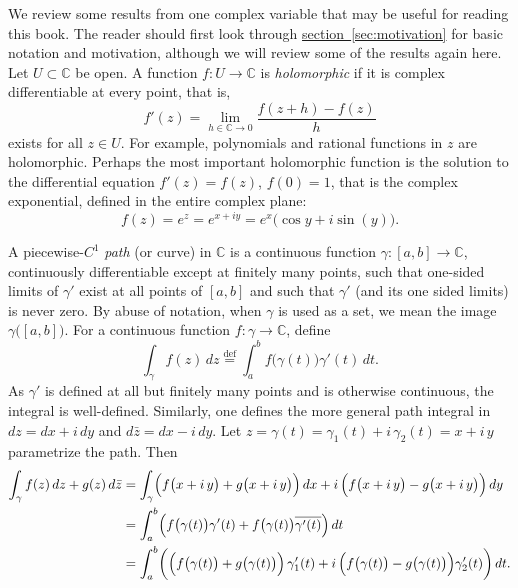 \documentclass[12pt,openany]{book}
\newcommand{\C}{{\mathbb{C}}}
\theoremstyle{plain}
\theoremstyle{remark}
\theoremstyle{definition}
\theoremstyle{exercise}
\theoremstyle{example}
\newcommand{\sectionref}[1]{\hyperref[#1]{section~\ref*{#1}}}
\begin{document}

We review some results from one complex variable that may be useful for
reading this book.
The reader should first look through \sectionref{sec:motivation}
for basic notation and motivation, although we will review some of the
results again here.
Let $U \subset \C$ be open.
A function
$f \colon U \to \C$ is \emph{holomorphic} if it is complex
differentiable at every point, that is,
\begin{equation*}
f'(z) = \lim_{h \in \C \to 0} \frac{f(z+h) - f(z)}{h}
\end{equation*}
exists for all $z \in U$.  For example, polynomials and rational
functions in $z$ are holomorphic.  Perhaps the most important holomorphic
function is the solution to the differential equation $f'(z) = f(z)$, $f(0) = 1$, that is
the complex exponential, defined in the entire complex plane:
\begin{equation*}
f(z) = e^z = e^{x+iy} = e^x \bigl( \cos y + i \sin(y) \bigr) .
\end{equation*}


A piecewise-$C^1$ \emph{path} (or curve) in $\C$
is a continuous function $\gamma \colon [a,b] \to \C$,
continuously differentiable except at finitely many points,
such that one-sided limits of $\gamma'$ exist at all points of $[a,b]$
and such that $\gamma'$ (and its one sided limits) is never zero.
By abuse of notation, when $\gamma$ is used as a set, we mean
the image
$\gamma\bigl([a,b]\bigr)$.
For a continuous function $f \colon \gamma \to \C$, define
%
\begin{equation*}
\int_\gamma f(z) \, dz 
\overset{\text{def}}{=}
\int_a^b f\bigl(\gamma(t)\bigr) \gamma'(t) \, dt .
\end{equation*}
As $\gamma'$ is defined at all but finitely many points and is otherwise
continuous, the integral is well-defined.  Similarly, one defines the more general
path integral in $dz = dx + i\,dy$ and $d\bar{z} = dx - i\, dy$.
Let
$z = \gamma(t) = \gamma_1(t) + i \, \gamma_2(t) = x + i\, y$
parametrize the path.  Then
\begin{equation*}
\begin{split}
\int_\gamma f(z) \, dz + g(z) \, d\bar{z}
& =
\int_\gamma
\Bigl(f\bigl(x+i\, y\bigr) + g\bigl(x+i\, y\bigr) \Bigr) \, dx
+
i \, \Bigl( f\bigl(x+i\, y\bigr) - g\bigl(x+i\, y\bigr) \Bigr) \, dy
\\
& =
\int_a^b
\Bigl(
f\bigl(\gamma(t)\bigr) \gamma'(t)
+
f\bigl(\gamma(t)\bigr) \overline{\gamma'(t)}
\Bigr) \, dt
\\
& =
\int_a^b
\biggl(
\Bigl(f\bigl(\gamma(t)\bigr) + g\bigl(\gamma(t)\bigr) \Bigr) \,
\gamma_1'(t)
+
i \, \Bigl( f\bigl(\gamma(t)\bigr) - g\bigl(\gamma(t)\bigr) \Bigr)
\gamma_2'(t)
\biggr)
\, dt .
\end{split}
\end{equation*}
\end{document}
